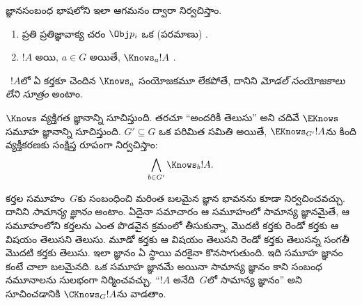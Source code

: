 \documentclass[../../../include/open-logic-section]{subfiles}
\begin{document}
\begin{defn}
జ్ఞానసంబంధ భాషలోని \emph{}
  ఇలా ఆగమనం ద్వారా నిర్వచిస్తాం.
\begin{enumerate}


\item ప్రతి ప్రతిజ్ఞావాక్య చరం $\Obj p_i$ ఒక (పరమాణు) .






\item $!A$  అయి, $a \in G$ అయితే, $\Knows_a !A$
  .

\end{enumerate}
\end{defn}

~$!A$లో ఏ కర్తకూ చెందిన $\Knows_a$ సంయోజకమూ లేకపోతే, దానిని
\emph{మోడల్ సంయోజకాలు లేని సూత్రం} అంటాం.

\begin{defn}
  $\Knows$ వ్యక్తిగత జ్ఞానాన్ని సూచిస్తుంది. తరచూ ``అందరికీ తెలుసు'' అని చదివే $\EKnows$
  సమూహ జ్ఞానాన్ని సూచిస్తుంది. $G' \subseteq G$ ఒక పరిమిత సమితి అయితే,
  $\EKnows_{G'} !A$ను కింది వ్యక్తీకరణకు సంక్షిప్త
  రూపంగా నిర్వచిస్తాం: \[\bigwedge_{b \in G'} \Knows_b !A.\]
\end{defn}

కర్తల సమూహం~$G$కు సంబంధించి మరింత బలమైన జ్ఞాన భావనను
కూడా నిర్వచించవచ్చు. దానిని \emph{సామాన్య జ్ఞానం} అంటాం.
ఏదైనా సమాచారం ఆ సమూహంలో సామాన్య జ్ఞానమైతే,
ఆ సమూహంలోని కర్తలను ఎంత పొడవైన క్రమంలో తీసుకున్నా, మొదటి కర్తకు
రెండో కర్తకు ఆ విషయం తెలుసని తెలుసు. మూడో కర్తకు ఆ విషయం
తెలుసని రెండో కర్తకు తెలుసన్న సంగతీ మొదటి కర్తకు తెలుసు.
ఇలా జ్ఞానం ఏ స్థాయి వరకైనా కొనసాగుతుంది. ఇది సమూహ జ్ఞానం కంటే
చాలా బలమైనది. ఒక 
సమూహ జ్ఞానమే అయినా సామాన్య జ్ఞానం కాని సంబంధ నమూనాలను
సులభంగా నిర్మించవచ్చు. ``$!A$ అనేది~$G$లో సామాన్య
జ్ఞానం'' అని సూచించడానికి $\CKnows_G !A$ను వాడతాం.
\end{document}
